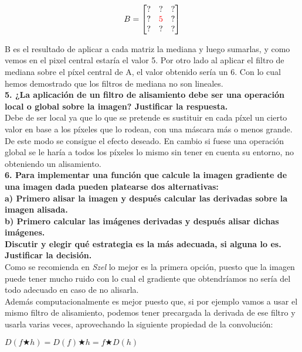 \documentclass[10pt,a4paper]{article}
\begin{document}
\[
B = 
\begin{bmatrix}
    ? & ? & ? \\
    ? & \textcolor{red}{5} & ? \\
    ? & ? & ?
\end{bmatrix}
\]

B es el resultado de aplicar a cada matriz la mediana y luego sumarlas, y como vemos en el pixel central estaría el valor 5. Por otro lado al aplicar el filtro de mediana sobre el píxel central de A, el valor obtenido sería un 6. Con lo cual hemos demostrado que los filtros de mediana no son lineales.\\

\textbf{5. ¿La aplicación de un filtro de alisamiento debe ser una operación local o global sobre la imagen? Justificar la respuesta.}\\

Debe de ser local ya que lo que se pretende es sustituir en cada píxel un cierto valor en base a los píxeles que lo rodean, con una máscara más o menos grande. De este modo se consigue el efecto deseado. En cambio si fuese una operación global se le haría a todos los píxeles lo mismo sin tener en cuenta su entorno, no obteniendo un alisamiento.\\

\textbf{6. Para implementar una función que calcule la imagen gradiente de una imagen dada pueden platearse dos alternativas:\\
a) Primero alisar la imagen y después calcular las derivadas sobre la imagen alisada.\\
b) Primero calcular las imágenes derivadas y después alisar dichas imágenes.\\
Discutir y elegir qué estrategia es la más adecuada, si alguna lo es. Justificar la decisión.
}\\

Como se recomienda en \textit{Szel} lo mejor es la primera opción, puesto que la imagen puede tener mucho ruido con lo cual el gradiente que obtendríamos no sería del todo adecuado en caso de no alisarla.\\

Además computacionalmente es mejor puesto que, si por ejemplo vamos a usar el mismo filtro de alisamiento, podemos tener precargada la derivada de ese filtro y usarla varias veces, aprovechando la siguiente propiedad de la convolución:

\begin{center}
$D(f \bigstar h) = D(f) \bigstar h = f \bigstar D(h)$
\end{center}
\end{document}
